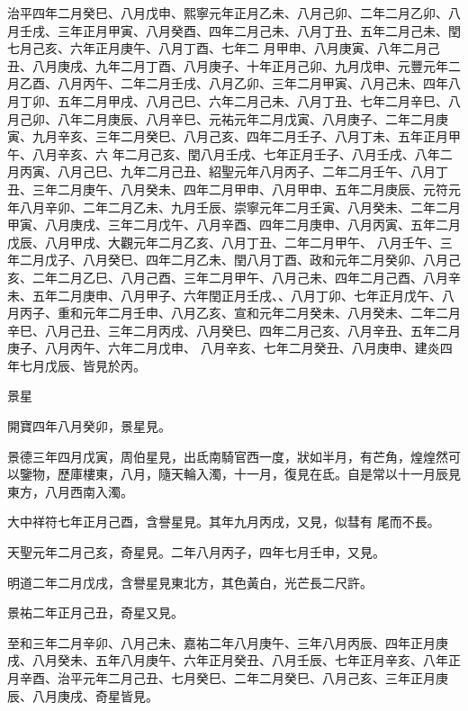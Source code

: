 \begin{pinyinscope}
 治平四年二月癸巳、八月戊申、熙寧元年正月乙未、八月己卯、二年二月乙卯、八月壬戌、三年正月甲寅、八月癸酉、四年二月己未、八月丁丑、五年二月己未、閏七月己亥、六年正月庚午、八月丁酉、七年二
 月甲申、八月庚寅、八年二月己丑、八月庚戌、九年二月丁酉、八月庚子、十年正月己卯、九月戊申、元豐元年二月乙酉、八月丙午、二年二月壬戌、八月乙卯、三年二月甲寅、八月己未、四年八月丁卯、五年二月甲戌、八月己巳、六年二月己未、八月丁丑、七年二月辛巳、八月己卯、八年二月庚辰、八月辛巳、元祐元年二月戊寅、八月庚子、二年二月庚寅、九月辛亥、三年二月癸巳、八月己亥、四年二月壬子、八月丁未、五年正月甲午、八月辛亥、六
 年二月己亥、閏八月壬戌、七年正月壬子、八月壬戌、八年二月丙寅、八月己巳、九年二月己丑、紹聖元年八月丙子、二年二月壬午、八月丁丑、三年二月庚午、八月癸未、四年二月甲申、八月甲申、五年二月庚辰、元符元年八月辛卯、二年二月乙未、九月壬辰、崇寧元年二月壬寅、八月癸未、二年二月甲寅、八月庚戌、三年二月戊午、八月辛酉、四年二月庚申、八月丙寅、五年二月戊辰、八月甲戌、大觀元年二月乙亥、八月丁丑、二年二月甲午、
 八月壬午、三年二月戊子、八月癸巳、四年二月乙未、閏八月丁酉、政和元年二月癸卯、八月己亥、二年二月乙巳、八月己酉、三年二月甲午、八月己未、四年二月己酉、八月辛未、五年二月庚申、八月甲子、六年閏正月壬戌、、八月丁卯、七年正月戊午、八月丙子、重和元年二月壬申、八月乙亥、宣和元年二月癸未、八月癸未、二年二月辛巳、八月己丑、三年二月丙戌、八月癸巳、四年二月己亥、八月辛丑、五年二月庚子、八月丙午、六年二月戊申、
 八月辛亥、七年二月癸丑、八月庚申、建炎四年七月戊辰、皆見於丙。



 景星



 開寶四年八月癸卯，景星見。



 景德三年四月戊寅，周伯星見，出氐南騎官西一度，狀如半月，有芒角，煌煌然可以鑒物，歷庫樓東，八月，隨天輪入濁，十一月，復見在氐。自是常以十一月辰見東方，八月西南入濁。



 大中祥符七年正月己酉，含譽星見。其年九月丙戌，又見，似彗有
 尾而不長。



 天聖元年二月己亥，奇星見。二年八月丙子，四年七月壬申，又見。



 明道二年二月戊戌，含譽星見東北方，其色黃白，光芒長二尺許。



 景祐二年正月己丑，奇星又見。



 至和三年二月辛卯、八月己未、嘉祐二年八月庚午、三年八月丙辰、四年正月庚戌、八月癸未、五年八月庚午、六年正月癸丑、八月壬辰、七年正月辛亥、八年正月辛酉、治平元年二月己丑、七月癸巳、二年二月癸巳、八月己亥、三年正月庚辰、八月庚戌、奇星皆見。




\end{pinyinscope}
